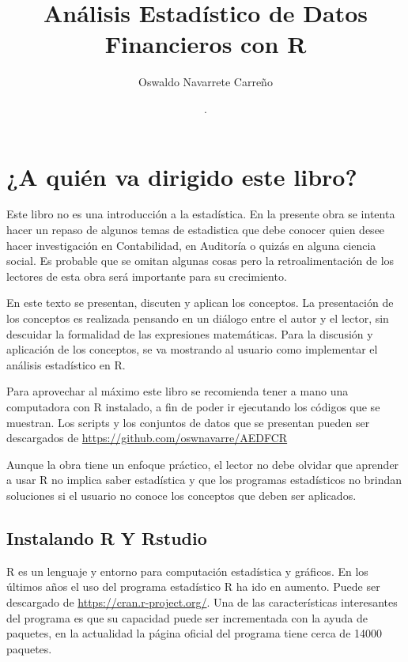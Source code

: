 \documentclass[letterpaper,]{book}
\title{Análisis Estadístico de Datos Financieros con R}
\author{Oswaldo Navarrete Carreño}
\date{.}
\begin{document}
\maketitle

{
\setcounter{tocdepth}{3}
\tableofcontents
}
\hypertarget{a-quien-va-dirigido-este-libro}{%
\chapter{¿A quién va dirigido este libro?}\label{a-quien-va-dirigido-este-libro}}

Este libro no es una introducción a la estadística. En la presente obra se intenta hacer un repaso de algunos temas de estadistica que debe conocer quien desee hacer investigación en Contabilidad, en Auditoría o quizás en alguna ciencia social. Es probable que se omitan algunas cosas pero la retroalimentación de los lectores de esta obra será importante para su crecimiento.

En este texto se presentan, discuten y aplican los conceptos. La presentación de los conceptos es realizada pensando en un diálogo entre el autor y el lector, sin descuidar la formalidad de las expresiones matemáticas. Para la discusión y aplicación de los conceptos, se va mostrando al usuario como implementar el análisis estadístico en R.

Para aprovechar al máximo este libro se recomienda tener a mano una computadora con R instalado, a fin de poder ir ejecutando los códigos que se muestran. Los scripts y los conjuntos de datos que se presentan pueden ser descargados de \url{https://github.com/oswnavarre/AEDFCR}

Aunque la obra tiene un enfoque práctico, el lector no debe olvidar que aprender a usar R no implica saber estadística y que los programas estadísticos no brindan soluciones si el usuario no conoce los conceptos que deben ser aplicados.

\hypertarget{instalando-r-y-rstudio}{%
\section{Instalando R Y Rstudio}\label{instalando-r-y-rstudio}}

R es un lenguaje y entorno para computación estadística y gráficos. En los últimos años el uso del programa estadístico R ha ido en aumento. Puede ser descargado de \url{https://cran.r-project.org/}. Una de las características interesantes del programa es que su capacidad puede ser incrementada con la ayuda de paquetes, en la actualidad la página oficial del programa tiene cerca de 14000 paquetes.
\end{document}
